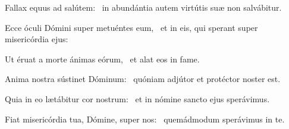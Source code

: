 \item Fallax equus ad salútem:~\psstar{} in abundántia autem virtútis suæ non salvábitur.

\item Ecce óculi Dómini super metuéntes eum,~\psstar{} et in eis, qui sperant super misericórdia ejus:

\item Ut éruat a morte ánimas eórum,~\psstar{} et alat eos in fame.

\item Anima nostra sústinet Dóminum:~\psstar{} quóniam adjútor et protéctor noster est.

\item Quia in eo lætábitur cor nostrum:~\psstar{} et in nómine sancto ejus sperávimus.

\item Fiat misericórdia tua, Dómine, super nos:~\psstar{} quemádmodum sperávimus in te.

